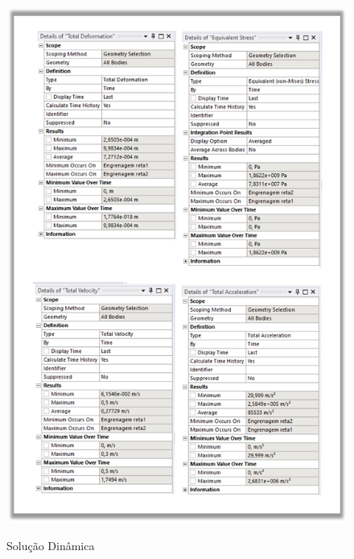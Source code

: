 \documentclass[deposito, acronym, symbols]{fei}
\begin{document}
 \begin{figure}[!htb]
 \centering
    \caption{Solução Dinâmica}
    \includegraphics[width=0.95\linewidth]{Imagens/solução dinamica.png}
    \label{fig: Setup do Workbench}
 \end{figure}
 
\end{document}

